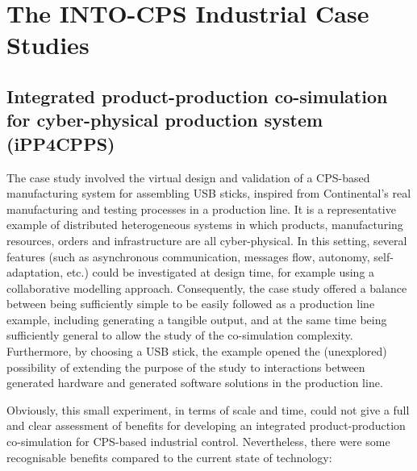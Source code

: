 


\section{The INTO-CPS Industrial Case Studies}\label{sec:casestudies}


\subsection{Integrated product-production co-simulation for cyber-physical production system (iPP4CPPS) } 

The case study involved the virtual design and validation of a CPS-based manufacturing system for assembling USB sticks, inspired from Continental's real manufacturing and testing processes in a production line. It is a representative example of distributed heterogeneous systems in which products, manufacturing resources, orders and infrastructure are all cyber-physical. In this setting, several features (such as asynchronous communication, messages flow, autonomy, self-adaptation, etc.) could be investigated at design time, for example using a collaborative modelling approach. Consequently, the case study offered a balance between being sufficiently simple to be easily followed as a production line example, including generating a tangible output, and at the same time being sufficiently general to allow the study of the co-simulation complexity. Furthermore, by choosing a USB stick, the example opened the (unexplored) possibility of extending the purpose of the study to interactions between generated hardware and generated software solutions in the production line.

Obviously, this small experiment, in terms of scale and time, could not give a full and clear assessment of benefits for developing an integrated product-production co-simulation for CPS-based industrial control. Nevertheless, there were some recognisable benefits compared to the current state of technology:


